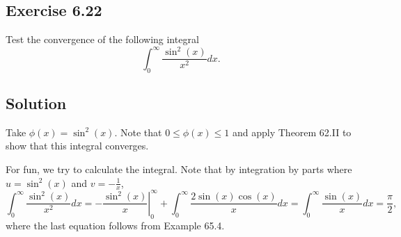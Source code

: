 \subsection*{Exercise 6.22}

Test the convergence of the following integral
\begin{equation*}
    \int_0^{\infty} \frac{\sin^2(x)}{x^2} dx.
\end{equation*}

\subsection*{Solution}

Take $\phi(x) = \sin^2(x)$.
Note that $0 \leq \phi(x) \leq 1$ and apply Theorem 62.II to show that this integral converges.

For fun, we try to calculate the integral.
Note that by integration by parts where $u = \sin^2(x)$ and $v = -\frac{1}{x}$,
\begin{equation*}
    \int_0^{\infty} \frac{\sin^2(x)}{x^2} dx
        = \left.-\frac{\sin^2(x)}{x} \right|_0^{\infty} + \int_0^{\infty} \frac{2\sin(x)\cos(x)}{x} dx
        = \int_0^{\infty} \frac{\sin(x)}{x} dx
        = \frac{\pi}{2},
\end{equation*}
where the last equation follows from Example 65.4.

